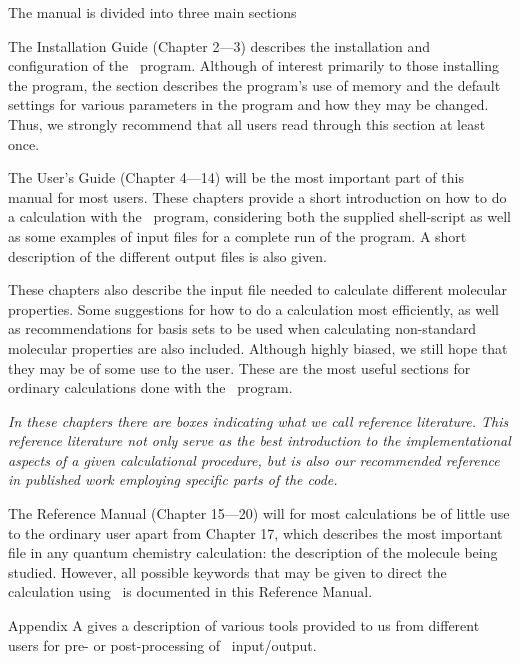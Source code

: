 The manual is divided into three main sections

\begin{description}
\item The Installation Guide (Chapter 2---3) describes the
installation and configuration of the \siraba\ program. Although of
interest primarily to those installing the program, the section
describes the program's use of memory and the default settings for
various parameters in the program and how they may be changed. Thus,
we strongly recommend that all users read through this section at least
once.

\item The User's Guide (Chapter 4---14) will be the most important part
of this manual for most users. These chapters provide a  short
introduction on how to do a calculation with the \siraba\ program,
considering both the supplied shell-script as well as some examples of
input files for a complete run of the program. A short description of
the different output files is also given. 

These chapters also describe the input file needed to
calculate different molecular properties. Some
suggestions for how to do a calculation most efficiently, as well as
recommendations for basis sets to be used when calculating non-standard
molecular properties are also included. Although highly biased, we
still hope that they may be of some 
use to the user. These are the most useful sections for
ordinary calculations done with the \siraba\ program.

{\em In these chapters there are boxes indicating what we call {\em
reference literature}. This reference
literature not only serve as 
the best introduction to the implementational aspects of a given
calculational procedure, but is also our recommended reference in published
work employing specific parts of the code.}

\item The Reference Manual (Chapter 15---20) will for most calculations be of
little use to the ordinary user apart from Chapter 17, which describes
the most important file in any quantum chemistry calculation: the
description of the molecule being studied. However, all possible
keywords that may be given to direct the calculation using \siraba\ is
documented in this Reference Manual.

\item Appendix A gives a description of various tools provided to us
from different users for pre- or post-processing of \siraba\
input/output.
\end{description}

